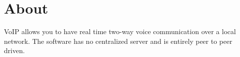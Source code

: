 \hypertarget{index_About}{}\section{\-About}\label{index_About}
\-Vo\-I\-P allows you to have real time two-\/way voice communication over a local network. \-The software has no centralized server and is entirely peer to peer driven. 